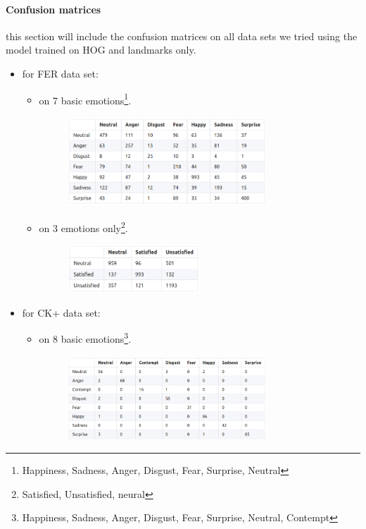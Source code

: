 \paragraph{Confusion matrices}
this section will include the confusion matrices on all data sets we tried using the model trained on HOG and landmarks only.
\begin{itemize}
	\item for FER data set:
		\begin{itemize}
			\item on 7 basic emotions\footnote{Happiness, Sadness, Anger, Disgust, Fear, Surprise, Neutral}.
			\begin{figure}[H]
				\centering
				\includegraphics[width=0.75\textwidth]{images/fer_long.png}
			\end{figure}
		
			\item on 3 emotions only\footnote{Satisfied, Unsatisfied, neural}.
			\begin{figure}[H]
				\centering
				\includegraphics[width=0.5\textwidth]{images/fer_short.png}
			\end{figure}
		\end{itemize}
		
	\item for CK+ data set:
		\begin{itemize}
			\item on 8 basic emotions\footnote{Happiness, Sadness, Anger, Disgust, Fear, Surprise, Neutral, Contempt}.
			\begin{figure}[H]
				\centering
				\includegraphics[width=0.75\textwidth]{images/ck_long.png}
			\end{figure}
			

\end{itemize}
\end{itemize}
